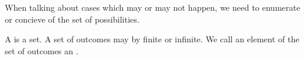 
\sbasic














\sstart
{}


When talking about cases which
may or may not happen, we need
to enumerate or concieve of the
set of possibilities.


A 
is a set.
A set of outcomes may by finite
or infinite.
We call an element of the
set of outcomes an .
\strats

